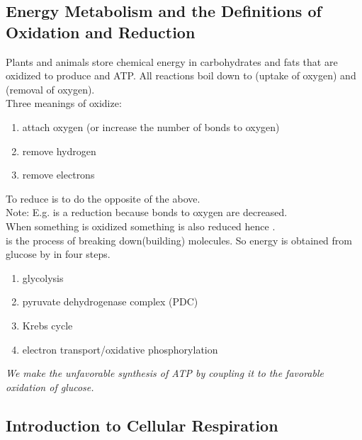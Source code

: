 \documentclass[../Bio_chemistryReview.tex]{subfiles}
\begin{document}
\subsection{Energy Metabolism and the Definitions of Oxidation and Reduction}

Plants and animals store chemical energy in carbohydrates and fats that are
oxidized to produce  and ATP. All reactions boil down to
 (uptake of oxygen) and  (removal of
oxygen).\\
Three meanings of oxidize:
\begin{enumerate}
  \item attach oxygen (or increase the number of bonds to oxygen)
  \item remove hydrogen
  \item remove electrons
\end{enumerate}
To reduce is to do the opposite of the above.\\

Note: E.g.    is a reduction because bonds to oxygen
are decreased.\\
When something is oxidized something is also reduced hence .\\
 is the process of breaking down(building)
molecules. So energy is obtained from glucose by  in
four steps.  
\begin{enumerate}
  \item glycolysis
  \item pyruvate dehydrogenase complex (PDC)
  \item Krebs cycle
  \item electron transport/oxidative phosphorylation
\end{enumerate} 

\emph{We make the unfavorable synthesis of ATP by coupling it to the favorable
oxidation of glucose.}

\subsection{Introduction to Cellular Respiration}
\end{document}
